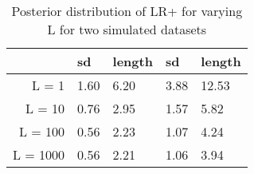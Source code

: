 \begin{table}[ht]
\centering
\begin{tabular}{rllll}
  \hline
 & sd & length & sd & length \\ 
  \hline
L = 1 & 1.60 & 6.20 & 3.88 & 12.53 \\ 
  L = 10 & 0.76 & 2.95 & 1.57 & 5.82 \\ 
  L = 100 & 0.56 & 2.23 & 1.07 & 4.24 \\ 
  L = 1000 & 0.56 & 2.21 & 1.06 & 3.94 \\ 
   \hline
\end{tabular}
\caption{Posterior distribution of LR+ for varying L for two simulated datasets} 
\end{table}
